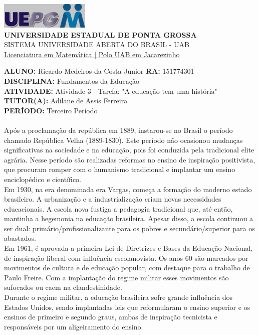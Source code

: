 \documentclass[a4paper, 12pt]{article}
\begin{document}
\begin{flushleft}\includegraphics{logo}\\
\textbf{UNIVERSIDADE ESTADUAL DE PONTA GROSSA} \\
SISTEMA UNIVERSIDADE ABERTA DO BRASIL - UAB \\
\underline{Licenciatura em Matemática | Polo UAB em Jacarezinho}\end{flushleft} 
\textbf{ALUNO:} Ricardo Medeiros da Costa Junior   \textbf{RA:} 151774301 \\
\textbf{DISCIPLINA:} Fundamentos da Educação\\
\textbf{ATIVIDADE:} Atividade 3 - Tarefa: "A educação tem uma história"\\
\textbf{TUTOR(A):} Adilane de Assis Ferreira\\
\textbf{PERÍODO:} Terceiro Período \\ \\
Após a proclamação da república em 1889, instarou-se no Brasil o período chamado República Velha (1889-1830). Este período não ocasionou mudanças significativas na sociedade e na educação, pois foi conduzida pela tradicional elite agrária. Nesse período são realizadas reformas no ensino de inspiração positivista, que procuram romper com o humanismo tradicional e implantar um ensino enciclopédico e científico.\\
Em 1930, na era denominada era Vargas, começa a formação do moderno estado brasileiro. A urbanização e a industrialização criam novas necessidades educacionais. A escola nova fustiga a pedagogia tradicional que, até então, mantinha a hegemonia na educação brasileira. Apesar disso, a escola continuou a ser dual: primário/profissionalizante para os pobres e secundário/superior para os abastados.\\
Em 1961, é aprovada a primeira Lei de Diretrizes e Bases da Educação Nacional, de inspiração liberal com influência escolanovista. Os anos 60 são marcados por movimentos de cultura e de educação popular, com destaque para o trabalho de Paulo Freire. Com a implantação do regime militar esses movimentos são sufocados ou caem na clandestinidade.\\
Durante o regime militar, a educação brasileira sofre grande influência dos Estados Unidos, sendo implantadas leis que reformularam o ensino superior e os ensinos de primeiro e segundo graus, ambas de inspiração tecnicista e responsáveis por um aligeiramento do ensino.\\
\end{document}
